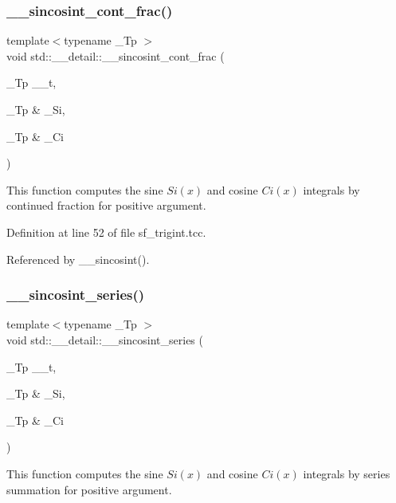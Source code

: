 \subsubsection{\texorpdfstring{\+\_\+\+\_\+sincosint\+\_\+cont\+\_\+frac()}{\_\_sincosint\_cont\_frac()}}
{\footnotesize\ttfamily template$<$typename \+\_\+\+Tp $>$ \\
void std\+::\+\_\+\+\_\+detail\+::\+\_\+\+\_\+sincosint\+\_\+cont\+\_\+frac (\begin{DoxyParamCaption}\item[{\+\_\+\+Tp}]{\+\_\+\+\_\+t,  }\item[{\+\_\+\+Tp \&}]{\+\_\+\+Si,  }\item[{\+\_\+\+Tp \&}]{\+\_\+\+Ci }\end{DoxyParamCaption})}



This function computes the sine $ Si(x) $ and cosine $ Ci(x) $ integrals by continued fraction for positive argument. 



Definition at line 52 of file sf\+\_\+trigint.\+tcc.



Referenced by \+\_\+\+\_\+sincosint().

\mbox{\label{namespacestd_1_1____detail_aea85e0044476065ed4a067f1aa9647cb}} 
\subsubsection{\texorpdfstring{\+\_\+\+\_\+sincosint\+\_\+series()}{\_\_sincosint\_series()}}
{\footnotesize\ttfamily template$<$typename \+\_\+\+Tp $>$ \\
void std\+::\+\_\+\+\_\+detail\+::\+\_\+\+\_\+sincosint\+\_\+series (\begin{DoxyParamCaption}\item[{\+\_\+\+Tp}]{\+\_\+\+\_\+t,  }\item[{\+\_\+\+Tp \&}]{\+\_\+\+Si,  }\item[{\+\_\+\+Tp \&}]{\+\_\+\+Ci }\end{DoxyParamCaption})}



This function computes the sine $ Si(x) $ and cosine $ Ci(x) $ integrals by series summation for positive argument. 



